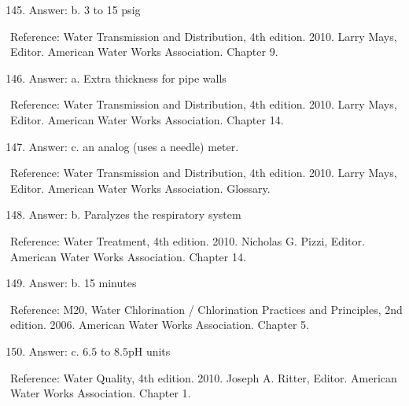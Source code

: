 \documentclass[10pt]{article}
\begin{document}
\begin{enumerate}
  \setcounter{enumi}{144}
  \item Answer: b. 3 to 15 psig
\end{enumerate}

Reference: Water Transmission and Distribution, 4th edition. 2010. Larry Mays, Editor. American Water Works Association. Chapter 9.

\begin{enumerate}
  \setcounter{enumi}{145}
  \item Answer: a. Extra thickness for pipe walls
\end{enumerate}

Reference: Water Transmission and Distribution, 4th edition. 2010. Larry Mays, Editor. American Water Works Association. Chapter 14.

\begin{enumerate}
  \setcounter{enumi}{146}
  \item Answer: c. an analog (uses a needle) meter.
\end{enumerate}

Reference: Water Transmission and Distribution, 4th edition. 2010. Larry Mays, Editor. American Water Works Association. Glossary.

\begin{enumerate}
  \setcounter{enumi}{147}
  \item Answer: b. Paralyzes the respiratory system
\end{enumerate}

Reference: Water Treatment, 4th edition. 2010. Nicholas G. Pizzi, Editor. American Water Works Association. Chapter 14.

\begin{enumerate}
  \setcounter{enumi}{148}
  \item Answer: b. 15 minutes
\end{enumerate}

Reference: M20, Water Chlorination / Chlorination Practices and Principles, 2nd edition. 2006. American Water Works Association. Chapter 5.

\begin{enumerate}
  \setcounter{enumi}{149}
  \item Answer: c. $6.5$ to $8.5 \mathrm{pH}$ units
\end{enumerate}

Reference: Water Quality, 4th edition. 2010. Joseph A. Ritter, Editor. American Water Works Association. Chapter 1.
\end{document}

